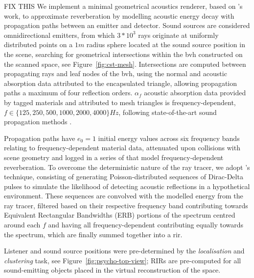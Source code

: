 FIX THIS
We implement a minimal geometrical acoustics renderer, based on \cite{saviojaGA}'s work, to approximate reverberation by modelling acoustic energy decay with propagation paths between an emitter and detector. Sound sources are considered omnidirectional emitters, from which $3*10^3$ rays originate at uniformly distributed points on a $1m$ radius sphere located at the sound source position in the scene, searching for geometrical intersections within the \acrshort{bvh} constructed on the scanned space, see Figure~\ref{fig:cst-mesh}. Intersections are computed between propagating rays and leaf nodes of the \acrshort{bvh}, using the normal and acoustic absorption data attributed to the encapsulated triangle, allowing propagation paths a maximum of four reflection orders.
$\alpha_f$ acoustic absorption data provided by tagged materials and attributed to mesh triangles is frequency-dependent, $f \in \{ 125, 250, 500, 1000, 2000, 4000 \}Hz$, following state-of-the-art sound propagation methods \citep{schissler2017acoustic}.\par


Propagation paths have $e_0 = 1$ initial energy values across six frequency bands relating to frequency-dependent material data, attenuated upon collisions with scene geometry and logged in a series of  that model frequency-dependent reverberation. To overcome the deterministic nature of the ray tracer, we adopt \cite{schroder2011physically}'s technique, consisting of generating Poisson-distributed sequences of Dirac-Delta pulses to simulate the likelihood of detecting acoustic reflections in a hypothetical environment. These sequences are convolved with the modelled energy from the ray tracer, filtered based on their respective frequency band contributing towards Equivalent Rectangular Bandwidths (ERB) portions of the spectrum centred around each $f$ and having all frequency-dependent  contributing equally towards the spectrum, which are finally summed together into a \acrshort{rir}. \par
Listener and sound source positions were pre-determined by the \emph{localisation} and \emph{clustering} task, see Figure~\ref{fig:psycho-top-view}; RIRs are pre-computed for all sound-emitting objects placed in the virtual reconstruction of the space.

